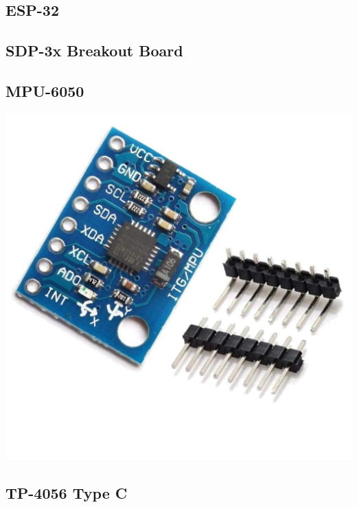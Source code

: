 \subsection{ESP-32}
\vspace{5mm}

\subsection{SDP-3x Breakout Board}
\vspace{5mm}

\subsection{MPU-6050}
\vspace{5mm}

\begin{center}
    \includegraphics[scale=0.2]{diagrams/oem/6050.jpg}\\
    \caption{Gyroscope and Accelrometer\footnote{Image courtesy of HiLetGo and Amazon.com}}
\end{center}

\subsection{TP-4056 Type C}
\vspace{5mm}

